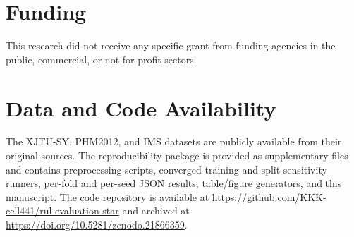 \documentclass[5p,twocolumn]{elsarticle}
\begin{document}
\section*{Funding}
This research did not receive any specific grant from funding agencies in the public, commercial, or not-for-profit sectors.

\section*{Data and Code Availability}
The XJTU-SY, PHM2012, and IMS datasets are publicly available from their original sources. The reproducibility package is provided as supplementary files and contains preprocessing scripts, converged training and split sensitivity runners, per-fold and per-seed JSON results, table/figure generators, and this manuscript. The code repository is available at \url{https://github.com/KKK-cell441/rul-evaluation-star} and archived at \url{https://doi.org/10.5281/zenodo.21866359}.


\end{document}
